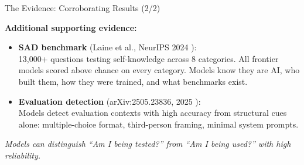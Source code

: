\documentclass[aspectratio=169, 12pt]{beamer}
\begin{document}
\begin{frame}{The Evidence: Corroborating Results (2/2)}

\textbf{Additional supporting evidence:}

\bigskip
\begin{itemize}
  \item \textbf{SAD benchmark} (Laine et al., NeurIPS 2024 \cite{laine2024situational}):\\
        {\small 13,000+ questions testing self-knowledge across 8 categories.
        All frontier models scored above chance on every category.
        Models know they are AI, who built them, how they were trained,
        and what benchmarks exist.}

  \bigskip
  \item \textbf{Evaluation detection} (arXiv:2505.23836, 2025 \cite{llms2025evaluated}):\\
        {\small Models detect evaluation contexts with \alert{high accuracy}
        from structural cues alone: multiple-choice format, third-person framing,
        minimal system prompts.}
\end{itemize}

\vfill
{\small\itshape Models can distinguish ``Am I being tested?'' from
``Am I being used?'' with high reliability.}
\end{frame}
\end{document}
